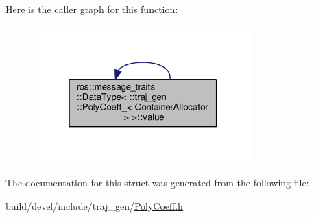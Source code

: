 Here is the caller graph for this function\+:
\nopagebreak
\begin{figure}[H]
\begin{center}
\leavevmode
\includegraphics[width=241pt]{structros_1_1message__traits_1_1_data_type_3_01_1_1traj__gen_1_1_poly_coeff___3_01_container_allocator_01_4_01_4_a785e6d39c2c99e53bbb56485af512bec_icgraph}
\end{center}
\end{figure}




The documentation for this struct was generated from the following file\+:\begin{DoxyCompactItemize}
\item 
build/devel/include/traj\+\_\+gen/\hyperlink{_poly_coeff_8h}{Poly\+Coeff.\+h}\end{DoxyCompactItemize}
